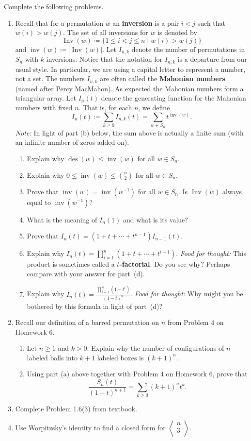 \documentclass[11pt]{article}%
\theoremstyle{definition}
\DeclareMathOperator{\des}{des}
\DeclareMathOperator{\Inv}{Inv}
\DeclareMathOperator{\inv}{inv}
\newcommand{\euler}[2]{
  \displaystyle \left\langle\begin{matrix}#1  \\#2  \\ \end{matrix}\right\rangle}
\begin{document}
Complete the following problems. 
\begin{enumerate}
\item Recall that for a permutation $w$ an \textbf{inversion} is a pair $i<j$ such that $w(i)>w(j)$.  The set of all inversions for $w$ is denoted by
\[
\Inv(w)\coloneqq \{1\leq i<j\leq n\mid w(i)>w(j)\}
\] 
and $\inv(w)\coloneqq |\Inv(w)|$. Let $I_{n,k}$ denote the number of permutations in $S_n$ with $k$ inversions.  Notice that the notation for $I_{n,k}$ is a departure from our usual style.  In particular, we are using a capital letter to represent a number, not a set. The numbers $I_{n,k}$ are often called the \textbf{Mahonian numbers} (named after Percy MacMahon). As expected the Mahonian numbers form a triangular array. Let $I_n(t)$ denote the generating function for the Mahonian numbers with fixed $n$. That is, for each $n$, we define
\[
I_n(t)\coloneqq \sum_{k\geq 0}I_{n,k}(t)=\sum_{w\in S_n} t^{\inv(w)}.
\]
\emph{Note:} In light of part (b) below, the sum above is actually a finite sum (with an infinite number of zeros added on).
\begin{enumerate}
\item Explain why $\des(w)\leq \inv(w)$ for all $w\in S_n$.
\item Explain why $0\leq \inv(w)\leq \binom{n}{2}$ for all $w\in S_n$.
\item Prove that $\inv(w)=\inv(w^{-1})$ for all $w\in S_n$. Is $\Inv(w)$ always equal to $\inv(w^{-1})$?
\item What is the meaning of $I_n(1)$ and what is its value?
\item Prove that $I_n(t)=(1+t+\cdots +t^{n-1})I_{n-1}(t)$.
\item Explain why $I_n(t)=\prod_{i=1}^n (1+t+\cdots +t^{i-1})$. \emph{Food for thought:} This product is sometimes called a \textbf{$t$-factorial}. Do you see why? Perhaps compare with your answer for part~(d).
\item Explain why $\displaystyle I_n(t)=\frac{\prod_{i=1}^n(1-t^i)}{(1-t)^n}$. \emph{Food for thought:} Why might you be bothered by this formula in light of part~(d)?
\end{enumerate}
\item Recall our definition of a barred permutation on $n$ from Problem 4 on Homework 6.
\begin{enumerate}
\item Let $n\geq 1$ and $k>0$. Explain why the number of configurations of $n$ labeled balls into $k+1$ labeled boxes is $(k+1)^n$.
\item Using part (a) above together with Problem 4 on Homework 6, prove that
\[
\frac{S_n(t)}{(1-t)^{n+1}}=\sum_{k\geq 0}(k+1)^nt^k.
\]
\end{enumerate}
\item Complete Problem 1.6(3) from textbook.
\item Use Worpitzsky's identity to find a closed form for $\euler{n}{3}$.
\end{enumerate}
\end{document}

